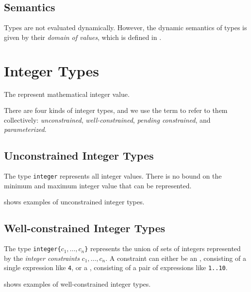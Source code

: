 \subsection{Semantics}
Types are not evaluated dynamically.
However, the dynamic semantics of types is given by their \emph{domain of values},
which is defined in .

\hypertarget{integertypeterm}{}
\section{Integer Types\label{sec:IntegerTypes}}
The \emph{\integertypesterm{}} represent mathematical integer value.

There are four kinds of integer types, and we
use the term \integertypeterm{} to refer to them collectively:
\emph{unconstrained}, \emph{well-constrained},
\emph{pending constrained}, and \emph{parameterized}.

\subsection{Unconstrained Integer Types}
\hypertarget{def-unconstrainedintegertype}{}
The type \verb|integer| represents all integer values.
%
There is no bound on the minimum and maximum integer value that can be represented.

 shows examples of unconstrained integer types.

\subsection{Well-constrained Integer Types}
%
The type \texttt{integer\{$c_1,\ldots,c_n$\}} represents the
union of sets of integers represented by the \emph{integer constraints} $c_1,\ldots,c_n$.
\hypertarget{def-exactconstraintterm}{}
\hypertarget{def-rangeconstraintterm}{}
A constraint can either be an \emph{\exactconstraintterm}, consisting of a single expression like \texttt{4},
or a \emph{\rangeconstraintterm}, consisting of a pair of expressions like \texttt{1..10}.

\hypertarget{def-wellconstrainedintegertype}{}
 shows examples of well-constrained integer types.

